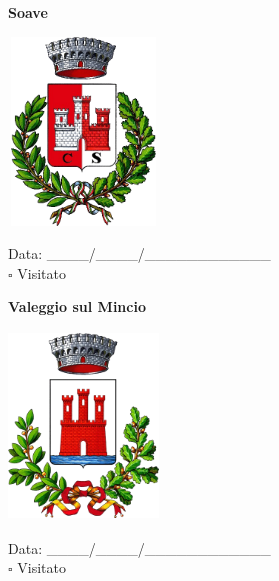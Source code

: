 \documentclass[a5paper,12pt]{article}
\begin{document}
\noindent
\begin{minipage}[t]{0.45\textwidth}
    \begin{center}
        \textbf{Soave}
    \end{center}
    \vspace{-0.5cm} %
    \begin{center}
        \includegraphics[height= 5cm, width=4cm]{Veneto/Stemma Soave.png}
    \end{center}
    \vspace{-0.4cm} %
    \begin{flushleft}
        Data: \_\_\_\_/\_\_\_\_/\_\_\_\_\_\_\_\_\_\_\_\_ \\
        $\square$ Visitato
    \end{flushleft}
\end{minipage}
\hfill
\noindent
\begin{minipage}[t]{0.45\textwidth}
    \begin{center}
        \textbf{Valeggio sul Mincio}
    \end{center}
    \vspace{-0.5cm} %
    \begin{center}
        \includegraphics[height= 5cm, width=4cm]{Veneto/Stemma Valeggio sul Mincio.png}
    \end{center}
    \vspace{-0.4cm} %
    \begin{flushleft}
        Data: \_\_\_\_/\_\_\_\_/\_\_\_\_\_\_\_\_\_\_\_\_ \\
        $\square$ Visitato
    \end{flushleft}
\end{minipage}
\end{document}
